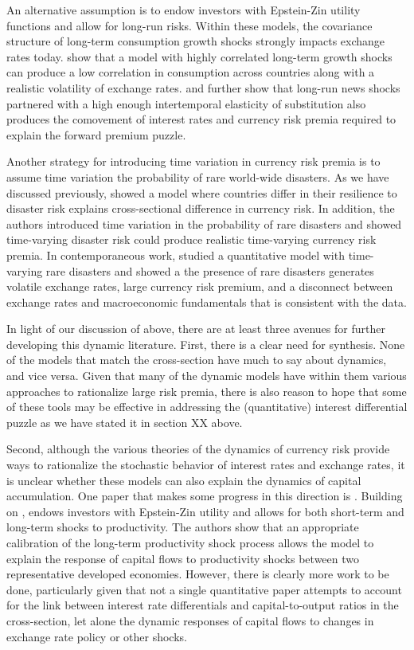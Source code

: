 \documentclass{ar-1col}
\begin{document}
An alternative assumption is to endow investors with Epstein-Zin utility functions and allow for long-run risks. Within these models, the covariance structure of long-term consumption growth shocks strongly impacts exchange rates today. \citet{ColacitoCroce2011} show that a model with highly correlated long-term growth shocks can produce a low correlation in consumption across countries along with a realistic volatility of exchange rates. \citet{BansalShaliastovich2012} and \citet{ColacitoCroce2013} further show that long-run news shocks partnered with a high enough intertemporal elasticity of substitution also produces the comovement of interest rates and currency risk premia required to explain the forward premium puzzle. 

Another strategy for introducing time variation in currency risk premia is to assume time variation the probability of rare world-wide disasters. As we have discussed previously, \citet{FarhiGabaix2016} showed a model where countries differ in their resilience to disaster risk explains cross-sectional difference in currency risk. In addition, the authors introduced time variation in the probability of rare disasters and showed time-varying disaster risk could produce realistic time-varying currency risk premia. In contemporaneous work, \citet{GourioSiemerVerdelhan2013} studied a quantitative model with time-varying rare disasters and showed a 
the presence of rare disasters generates volatile exchange rates, large currency risk premium, and a disconnect between exchange rates and macroeconomic fundamentals that is consistent with the data.

In light of our discussion of above, there are at least three avenues for further developing this dynamic literature. First, there is a clear need for synthesis. None of the models that match the cross-section have much to say about dynamics, and vice versa. Given that many of the dynamic models have within them various approaches to rationalize large risk premia, there is also reason to hope that some of these tools may be effective in addressing the (quantitative) interest differential puzzle as we have stated it in section XX above. 

Second, although the various theories of the dynamics of currency risk provide ways to rationalize the stochastic behavior of interest rates and exchange rates, it is unclear whether these models can also explain the dynamics of capital accumulation. One paper that makes some progress in this direction is \citet{ColacitoCroceHoHoward2018}. Building on \citet{ColacitoCroce2011, ColacitoCroce2013}, \citet{ColacitoCroceHoHoward2018} endows investors with Epstein-Zin utility and allows for both short-term and long-term shocks to productivity. The authors show that an appropriate calibration of the long-term productivity shock process allows the model to explain
the response of capital flows to productivity shocks between two representative developed economies. However, there is clearly more work to be done, particularly given that not a single quantitative paper attempts to account for the link between interest rate differentials and capital-to-output ratios in the cross-section, let alone the dynamic responses of capital flows to changes in exchange rate policy or other shocks.
\end{document}
